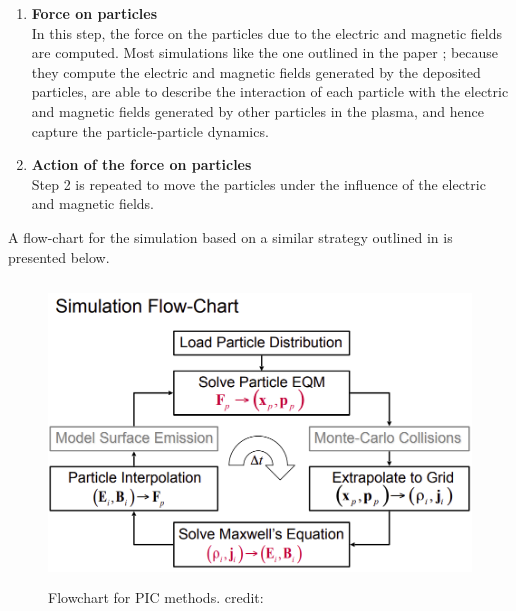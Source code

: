 \documentclass[12pt]{article}
\begin{document}
\begin{enumerate}
		\item \textbf{Force on particles} \\
		In this step, the force on the particles due to the electric and magnetic fields are computed. Most simulations like the one outlined in the paper \cite{PIC good}; because they compute the electric and magnetic fields generated by the deposited particles, are able to describe the interaction of each particle with the electric and magnetic fields generated by other particles in the plasma, and hence capture the particle-particle dynamics.
		\item \textbf{Action of the force on particles} \\
		Step 2 is repeated to move the particles under the influence of the electric and magnetic fields.
	\end{enumerate}

	A flow-chart for the simulation based on a similar strategy outlined in \cite{PIC IAS} is presented below.

	\begin{figure}[H]
		\begin{center}
			\includegraphics[width=12cm, height=8cm]{PIC.png} \caption{Flowchart for PIC methods. credit: \cite{PIC IAS}}
		\end{center}
	\end{figure}
	
\end{document}
